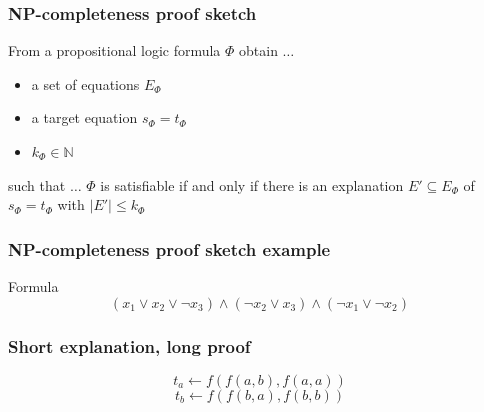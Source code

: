 \documentclass{beamer}
\begin{document}
\begin{frame}

\frametitle{NP-completeness proof sketch}

\begin{block}{From a propositional logic formula $\Phi$ obtain $\ldots$}

	\begin{itemize}
		\item a set of equations $E_{\Phi}$
		\item a target equation $s_{\Phi} = t_{\Phi}$
		\item $k_{\Phi} \in \mathbb{N}$
	\end{itemize}
\end{block}

\begin{block}{such that $\ldots$}
	$\Phi$ is satisfiable if and only if there is an explanation $E' \subseteq E_{\Phi}$ of $s_{\Phi} = t_{\Phi}$ with $|E'| \leq k_{\Phi}$
\end{block}


\end{frame}

\begin{frame}

\frametitle{NP-completeness proof sketch example}

\begin{block}{Formula}
$$(x_1 \vee x_2 \vee \neg x_3) \wedge (\neg x_2 \vee x_3) \wedge (\neg x_1 \vee \neg x_2)$$
\end{block}

\end{frame}

\begin{frame}

\frametitle{Short explanation, long proof}

$$t_a \leftarrow f(f(a,b),f(a,a))$$
$$t_b \leftarrow f(f(b,a),f(b,b))$$



\end{frame}
\end{document}
